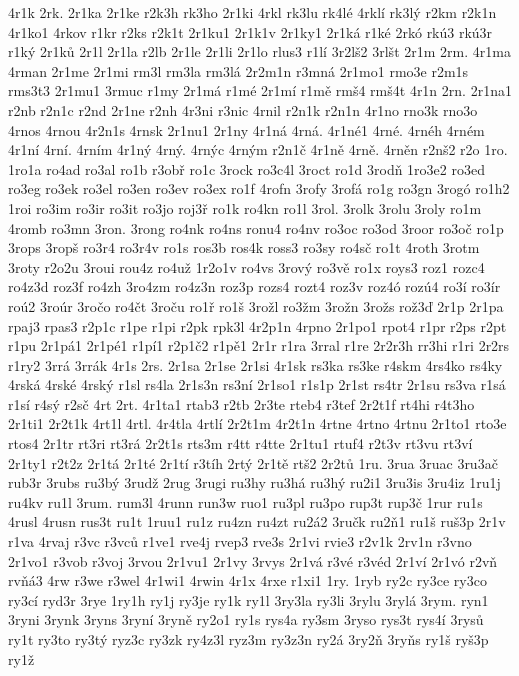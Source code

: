 {4r1k
2rk.
2r1ka
2r1ke
r2k3h
rk3ho
2r1ki
4rkl
rk3lu
rk4lé
4rklí
rk3lý
r2km
r2k1n
4r1ko1
4rkov
r1kr
r2ks
r2k1t
2r1ku1
2r1k1v
2r1ky1
2r1ká
r1ké
2rkó
rkú3
rkú3r
r1ký
2r1ků
2r1l
2r1la
r2lb
2r1le
2r1li
2r1lo
rlus3
r1lí
3r2lš2
3rlšt
2r1m
2rm.
4r1ma
4rman
2r1me
2r1mi
rm3l
rm3la
rm3lá
2r2m1n
r3mná
2r1mo1
rmo3e
r2m1s
rms3t3
2r1mu1
3rmuc
r1my
2r1má
r1mé
2r1mí
r1mě
rmš4
rmš4t
4r1n
2rn.
2r1na1
r2nb
r2n1c
r2nd
2r1ne
r2nh
4r3ni
r3nic
4rnil
r2n1k
r2n1n
4r1no
rno3k
rno3o
4rnos
4rnou
4r2n1s
4rnsk
2r1nu1
2r1ny
4r1ná
4rná.
4r1né1
4rné.
4rnéh
4rném
4r1ní
4rní.
4rním
4r1ný
4rný.
4rnýc
4rným
r2n1č
4r1ně
4rně.
4rněn
r2nš2
r2o
1ro.
1ro1a
ro4ad
ro3al
ro1b
r3obř
ro1c
3rock
ro3c4l
3roct
ro1d
3rodň
1ro3e2
ro3ed
ro3eg
ro3ek
ro3el
ro3en
ro3ev
ro3ex
ro1f
4rofn
3rofy
3rofá
ro1g
ro3gn
3rogó
ro1h2
1roi
ro3im
ro3ir
ro3it
ro3jo
roj3ř
ro1k
ro4kn
ro1l
3rol.
3rolk
3rolu
3roly
ro1m
4romb
ro3mn
3ron.
3rong
ro4nk
ro4ns
ronu4
ro4nv
ro3oc
ro3od
3roor
ro3oč
ro1p
3rops
3ropš
ro3r4
ro3r4v
ro1s
ros3b
ros4k
ross3
ro3sy
ro4sč
ro1t
4roth
3rotm
3roty
r2o2u
3roui
rou4z
ro4už
1r2o1v
ro4vs
3rový
ro3vě
ro1x
roys3
roz1
rozc4
ro4z3d
roz3f
ro4zh
3ro4zm
ro4z3n
roz3p
rozs4
rozt4
roz3v
roz4ó
rozú4
ro3í
ro3ír
roú2
3roúr
3ročo
ro4čt
3roču
ro1ř
ro1š
3rožl
ro3žm
3rožn
3rožs
rož3ď
2r1p
2r1pa
rpaj3
rpas3
r2p1c
r1pe
r1pi
r2pk
rpk3l
4r2p1n
4rpno
2r1po1
rpot4
r1pr
r2ps
r2pt
r1pu
2r1pá1
2r1pé1
r1pí1
r2p1č2
r1pě1
2r1r
r1ra
3rral
r1re
2r2r3h
rr3hi
r1ri
2r2rs
r1ry2
3rrá
3rrák
4r1s
2rs.
2r1sa
2r1se
2r1si
4r1sk
rs3ka
rs3ke
r4skm
4rs4ko
rs4ky
4rská
4rské
4rský
r1sl
rs4la
2r1s3n
rs3ní
2r1so1
r1s1p
2r1st
rs4tr
2r1su
rs3va
r1sá
r1sí
r4sý
r2sč
4rt
2rt.
4r1ta1
rtab3
r2tb
2r3te
rteb4
r3tef
2r2t1f
rt4hi
r4t3ho
2r1ti1
2r2t1k
4rt1l
4rtl.
4r4tla
4rtlí
2r2t1m
4r2t1n
4rtne
4rtno
4rtnu
2r1to1
rto3e
rtos4
2r1tr
rt3ri
rt3rá
2r2t1s
rts3m
r4tt
r4tte
2r1tu1
rtuf4
r2t3v
rt3vu
rt3ví
2r1ty1
r2t2z
2r1tá
2r1té
2r1tí
r3tíh
2rtý
2r1tě
rtš2
2r2tů
1ru.
3rua
3ruac
3ru3ač
rub3r
3rubs
ru3bý
3rudž
2rug
3rugi
ru3hy
ru3há
ru3hý
ru2i1
3ru3is
3ru4iz
1ru1j
ru4kv
ru1l
3rum.
rum3l
4runn
run3w
ruo1
ru3pl
ru3po
rup3t
rup3č
1rur
ru1s
4rusl
4rusn
rus3t
ru1t
1ruu1
ru1z
ru4zn
ru4zt
ru2á2
3ručk
ru2ň1
ru1š
ruš3p
2r1v
r1va
4rvaj
r3vc
r3vců
r1ve1
rve4j
rvep3
rve3s
2r1vi
rvie3
r2v1k
2rv1n
r3vno
2r1vo1
r3vob
r3voj
3rvou
2r1vu1
2r1vy
3rvys
2r1vá
r3vé
r3véd
2r1ví
2r1vó
r2vň
rvňá3
4rw
r3we
r3wel
4r1wi1
4rwin
4r1x
4rxe
r1xi1
1ry.
1ryb
ry2c
ry3ce
ry3co
ry3cí
ryd3r
3rye
1ry1h
ry1j
ry3je
ry1k
ry1l
3ry3la
ry3li
3rylu
3rylá
3rym.
ryn1
3ryni
3rynk
3ryns
3ryní
3ryně
ry2o1
ry1s
rys4a
ry3sm
3ryso
rys3t
rys4í
3rysů
ry1t
ry3to
ry3tý
ryz3c
ry3zk
ry4z3l
ryz3m
ry3z3n
ry2á
3ry2ň
3ryňs
ry1š
ryš3p
ry1ž
}
